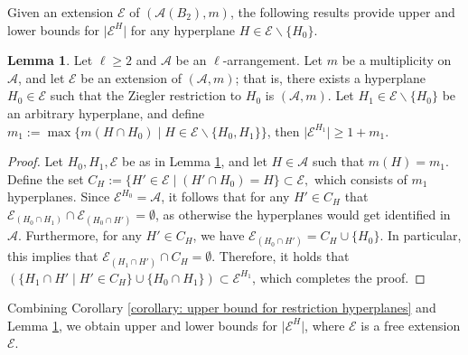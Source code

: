 \documentclass[12pt]{amsart}
\theoremstyle{definition}
\newtheorem{lemma}[theorem]{Lemma}
\theoremstyle{remark}
\newcommand\CA{{\mathscr A}}
\newcommand\CE{{\mathscr E}}
\begin{document}
Given an extension $\CE$ of $(\CA(B_2),m)$, the following results provide upper and lower bounds for $\vert \CE^H\vert$ for any hyperplane $H\in\CE\backslash\{H_0\}$.

\begin{lemma}\label{lemma: hyperplane cardinality of extension restriction}
    Let $\ell\geq 2$ and $\CA$ be an $\ell$-arrangement. Let $m$ be a multiplicity on $\CA$, and let $\CE$ be an extension of $(\CA,m)$; that is, there exists a hyperplane $H_0\in\CE$ such that the Ziegler restriction to $H_0$ is $(\CA,m)$. Let $ H_1\in\CE\backslash\{H_0\}$ be an arbitrary hyperplane, and define $m_1:=\max\{m(H\cap H_0)\mid H\in\CE\backslash\{H_0,H_1\}\}$, then $\vert\CE^{H_1}\vert\geq 1+m_1$. 
\end{lemma}

\begin{proof}
 Let $H_0, H_1, \CE$ be as in Lemma \ref{lemma: hyperplane cardinality of extension restriction}, and let $H\in\CA$ such that $m(H)=m_1$. Define the set $C_H:=\{H'\in\CE \mid (H'\cap H_0) = H\}\subset\CE,$ which consists of $m_1$ hyperplanes. Since $\CE^{H_0}=\CA$, it follows that for any $H'\in C_H$ that $\CE_{(H_0 \cap H_1)} \cap \CE_{(H_0 \cap H')}=\emptyset$, as otherwise the hyperplanes would get identified in $\CA$. Furthermore, for any $H'\in C_H$, we have $\CE_{(H_0\cap H')}=C_H\cup\{H_0\}$. In particular, this implies that $\CE_{(H_1\cap H')}\cap C_H=\emptyset$. Therefore, it holds that $(\{H_1\cap H'\mid H'\in C_H\}\cup\{H_0\cap H_1\})\subset \CE^{H_1}$, which completes the proof.
\end{proof}

Combining Corollary \ref{corollary: upper bound for restriction hyperplanes} and Lemma \ref{lemma: hyperplane cardinality of extension restriction}, we obtain upper and lower bounds for $\vert\CE^H\vert$, where $\CE$ is a free extension $\CE$.
\end{document}
